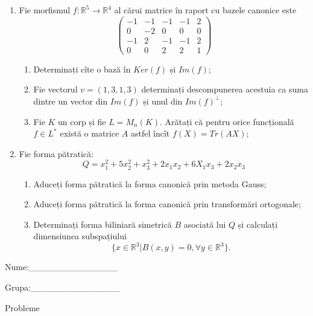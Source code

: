 \documentclass{article}
\begin{document}
\begin{enumerate}
 \item Fie morfismul $f:\mathbb{R}^5 \to \mathbb{R}^4$ al cărui matrice în raport cu bazele canonice este
$$\begin{pmatrix}
-1&-1&-1&-1&2\\
0&-2&0&0&0\\
-1&2&-1&-1&2\\
0&0&2&2&1
\end{pmatrix}$$

\begin{enumerate}
\item Determinați cîte o bază în $Ker(f)$ și $Im(f)$;
\item Fie vectorul $v=(1,3,1,3)$ determinați descompunerea acestuia ca suma dintre un vector din $Im(f)$ și unul din $Im(f)^\perp$;
\item Fie $K$ un corp și fie $L=M_n(K)$. Arătați că pentru orice funcțională $f \in L^*$ există o matrice $A$ astfel încît $f(X)=Tr(AX)$;
\end{enumerate}
\item Fie forma pătratică:
$$Q= x_1^2+5x_2^2+x_3^2+2x_1x_2+6X_1x_3+2x_2x_3$$

\begin{enumerate}
\item Aduceți forma pătratică la forma canonică prin metoda Gauss;
\item Aduceți forma pătratică la forma canonică prin transformări ortogonale;
\item Determinați forma biliniară simetrică $B$ asociată lui $Q$ și calculați dimensiunea subspațiului
$$\{x \in \mathbb{R}^3 | B(x,y)=0,\forall y \in \mathbb{R}^3\}.$$

\end{enumerate}
\end{enumerate}
\newpage
\begin{flushright}
Nume:\_\_\_\_\_\_\_\_\_\_\_\_\_\_
 
 
Grupa:\_\_\_\_\_\_\_\_\_\_\_\_\_\_
\end{flushright}
\begin{center}
\vspace{2cm}
{\Large Probleme}
\vspace{2cm}
\end{center}
\end{document}
